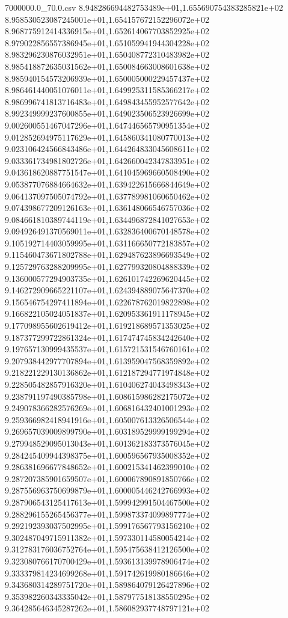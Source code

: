 \begin{filecontents*}{7000000.0_70.0.csv}
8.948286694482753489e+01,1.655690754383285821e+02
8.958530523087245001e+01,1.654157672152296072e+02
8.968775912414336915e+01,1.652614067703852925e+02
8.979022856557386945e+01,1.651059941944304228e+02
8.983296230876032951e+01,1.650408772310483982e+02
8.985418872635031562e+01,1.650084663008601638e+02
8.985940154573206939e+01,1.650005000229457437e+02
8.986461440051076011e+01,1.649925311585366217e+02
8.986996741813716483e+01,1.649843455952577642e+02
8.992349999237600855e+01,1.649023506523926699e+02
9.002600551467047296e+01,1.647446565790951354e+02
9.012852694975117629e+01,1.645860341080770013e+02
9.023106424566843486e+01,1.644264833045608611e+02
9.033361734981802726e+01,1.642660042347833951e+02
9.043618620887751547e+01,1.641045969660508490e+02
9.053877076884664632e+01,1.639422615666844649e+02
9.064137097505074792e+01,1.637789981060650462e+02
9.074398677209126163e+01,1.636148066546757036e+02
9.084661810389744119e+01,1.634496872841027653e+02
9.094926491370569011e+01,1.632836400670148578e+02
9.105192714403059995e+01,1.631166650772183857e+02
9.115460473671802788e+01,1.629487623896693549e+02
9.125729763288209995e+01,1.627799320804888339e+02
9.136000577294903735e+01,1.626101742269620445e+02
9.146272909665221107e+01,1.624394889075647370e+02
9.156546754297411894e+01,1.622678762019822898e+02
9.166822105024051837e+01,1.620953361911178945e+02
9.177098955602619412e+01,1.619218689571353025e+02
9.187377299722861324e+01,1.617474745834242640e+02
9.197657130999435537e+01,1.615721531546760161e+02
9.207938442977707894e+01,1.613959047568359892e+02
9.218221229130136862e+01,1.612187294771974848e+02
9.228505482857916320e+01,1.610406274043498343e+02
9.238791197490385798e+01,1.608615986282175072e+02
9.249078366282576269e+01,1.606816432401001293e+02
9.259366982418941916e+01,1.605007613326506544e+02
9.269657039009899790e+01,1.603189529999199294e+02
9.279948529095013043e+01,1.601362183373576045e+02
9.284245409944398375e+01,1.600596567935008352e+02
9.286381696677848652e+01,1.600215341462399010e+02
9.287207385901659507e+01,1.600067890891850766e+02
9.287556963750699879e+01,1.600005446242766993e+02
9.287906543125417613e+01,1.599942991504467500e+02
9.288296155265456377e+01,1.599873374099897774e+02
9.292192393037502995e+01,1.599176567793156210e+02
9.302487049715911382e+01,1.597330114580054214e+02
9.312783176036752764e+01,1.595475638412126500e+02
9.323080766170700429e+01,1.593613139978906474e+02
9.333379814234699268e+01,1.591742619980186646e+02
9.343680314289751720e+01,1.589864079126427896e+02
9.353982260343335042e+01,1.587977518138550295e+02
9.364285646345287262e+01,1.586082937748797121e+02

\end{filecontents*}
